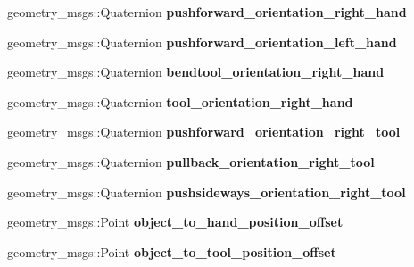 \begin{DoxyCompactItemize}
\item 
\mbox{\label{structManipulate_a7dd3832fc4aacbb85ef598accadc63ad}} 
geometry\+\_\+msgs\+::\+Quaternion {\bfseries pushforward\+\_\+orientation\+\_\+right\+\_\+hand}
\item 
\mbox{\label{structManipulate_acf6c76d4ec1f5eaac82b39b9ed0bc3a8}} 
geometry\+\_\+msgs\+::\+Quaternion {\bfseries pushforward\+\_\+orientation\+\_\+left\+\_\+hand}
\item 
\mbox{\label{structManipulate_aeda3751ad4e8accfa671165ad773648a}} 
geometry\+\_\+msgs\+::\+Quaternion {\bfseries bendtool\+\_\+orientation\+\_\+right\+\_\+hand}
\item 
\mbox{\label{structManipulate_ab66225a6f67280bb0e9b78793b65012d}} 
geometry\+\_\+msgs\+::\+Quaternion {\bfseries tool\+\_\+orientation\+\_\+right\+\_\+hand}
\item 
\mbox{\label{structManipulate_ae9efe74d9965220eead647d48b1ada3f}} 
geometry\+\_\+msgs\+::\+Quaternion {\bfseries pushforward\+\_\+orientation\+\_\+right\+\_\+tool}
\item 
\mbox{\label{structManipulate_a55a019678175543267a7bd12d1c3f9c1}} 
geometry\+\_\+msgs\+::\+Quaternion {\bfseries pullback\+\_\+orientation\+\_\+right\+\_\+tool}
\item 
\mbox{\label{structManipulate_acc2a6e973de289f80c06dda8073bba84}} 
geometry\+\_\+msgs\+::\+Quaternion {\bfseries pushsideways\+\_\+orientation\+\_\+right\+\_\+tool}
\item 
\mbox{\label{structManipulate_a7fdfcef6c6ff32756523caebda7ffbbb}} 
geometry\+\_\+msgs\+::\+Point {\bfseries object\+\_\+to\+\_\+hand\+\_\+position\+\_\+offset}
\item 
\mbox{\label{structManipulate_a21a65d8da8d19a36721da6079da3c32a}} 
geometry\+\_\+msgs\+::\+Point {\bfseries object\+\_\+to\+\_\+tool\+\_\+position\+\_\+offset}
\item 
\mbox{\label{structManipulate_adcbff4f017ab84c780533c18ec12f789}} 

\end{DoxyCompactItemize}

